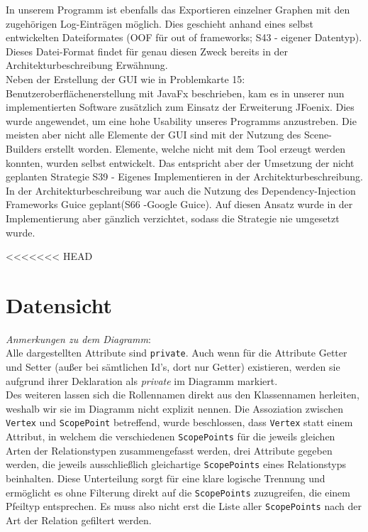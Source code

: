 \documentclass[enabledeprecatedfontcommands,fontsize=11pt,paper=a4,twoside]{scrartcl}
\begin{document}
In unserem Programm ist ebenfalls das Exportieren einzelner Graphen mit den zugehörigen Log-Einträgen möglich. Dies geschieht anhand eines selbst entwickelten Dateiformates (OOF für \glqq out of frameworks\grqq; S43 - eigener Datentyp). Dieses Datei-Format findet für genau diesen Zweck bereits in der Architekturbeschreibung Erwähnung.  \\

Neben der Erstellung der GUI wie in Problemkarte 15: Benutzeroberflächenerstellung mit JavaFx beschrieben, kam es in unserer nun implementierten Software zusätzlich zum Einsatz der Erweiterung JFoenix. Dies wurde angewendet, um eine hohe Usability unseres Programms anzustreben. Die meisten aber nicht alle Elemente der GUI sind mit der Nutzung des Scene-Builders erstellt worden. Elemente, welche nicht mit dem Tool erzeugt werden konnten, wurden selbst entwickelt. Das entspricht aber der Umsetzung der nicht geplanten Strategie S39 - Eigenes Implementieren in der Architekturbeschreibung.\\

In der Architekturbeschreibung war auch die Nutzung des Dependency-Injection Frameworks Guice geplant(S66 -Google Guice). Auf diesen Ansatz wurde in der Implementierung aber gänzlich verzichtet, sodass die Strategie nie umgesetzt wurde.

<<<<<<< HEAD
\newpage
\section{Datensicht}
\label{sec:datensicht}


\textit{Anmerkungen zu dem Diagramm}: \\
Alle dargestellten Attribute sind \texttt{private}. Auch wenn für die Attribute Getter und Setter (außer bei sämtlichen Id's, dort nur Getter) existieren, werden sie aufgrund ihrer Deklaration als \textit{private} im Diagramm markiert. \\
Des weiteren lassen sich die Rollennamen direkt aus den Klassennamen herleiten, weshalb wir sie im Diagramm nicht explizit nennen. Die Assoziation zwischen \texttt{Vertex} und \texttt{ScopePoint} betreffend, wurde beschlossen, dass \texttt{Vertex} statt einem Attribut, in welchem die verschiedenen \texttt{ScopePoints} für die jeweils gleichen Arten der Relationstypen zusammengefasst werden, drei Attribute gegeben werden, die jeweils ausschließlich gleichartige \texttt{ScopePoints} eines Relationstyps beinhalten. Diese Unterteilung sorgt für eine klare logische Trennung und ermöglicht es ohne Filterung direkt auf die \texttt{ScopePoints} zuzugreifen, die einem Pfeiltyp entsprechen. Es muss also nicht erst die Liste aller \texttt{ScopePoints} nach der Art der Relation gefiltert werden.\\
\end{document}
